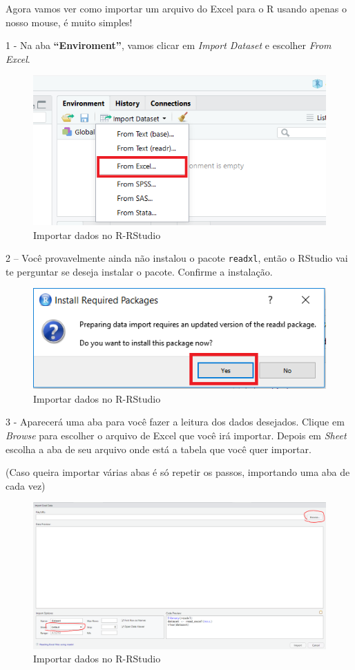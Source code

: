 \documentclass[
]{book}
\begin{document}
Agora vamos ver como importar um arquivo do Excel para o R usando apenas
o nosso mouse, é muito simples!

1 - Na aba \textbf{``Enviroment''}, vamos clicar em \emph{Import
Dataset} e escolher \emph{From Excel}.

\begin{figure}
\centering
\includegraphics{imagens/5_excel1.png}
\caption{Importar dados no R-RStudio}
\end{figure}

2 -- Você provavelmente ainda não instalou o pacote \texttt{readxl},
então o RStudio vai te perguntar se deseja instalar o pacote. Confirme a
instalação.

\begin{figure}
\centering
\includegraphics{imagens/5_excel2.png}
\caption{Importar dados no R-RStudio}
\end{figure}

3 - Aparecerá uma aba para você fazer a leitura dos dados desejados.
Clique em \emph{Browse} para escolher o arquivo de Excel que você irá
importar. Depois em \emph{Sheet} escolha a aba de seu arquivo onde está
a tabela que você quer importar.

(Caso queira importar várias abas é só repetir os passos, importando uma
aba de cada vez)

\begin{figure}
\centering
\includegraphics{imagens/5_excel3.png}
\caption{Importar dados no R-RStudio}
\end{figure}
\end{document}
